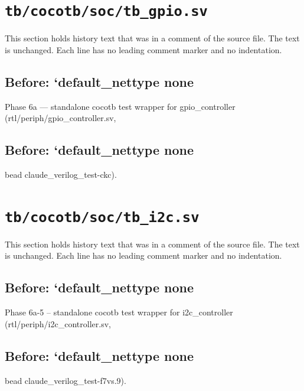 \section{\texttt{tb/cocotb/soc/tb\_gpio.sv}}\label{cr:suite:soc-tb-gpio-sv}

This section holds history text that was in a comment of the source file. The text is unchanged. Each line has no leading comment marker and no indentation.

\begin{record}

\subsection*{Before: `default\_nettype none}

\begin{textblock}
Phase 6a — standalone cocotb test wrapper for gpio_controller (rtl/periph/gpio_controller.sv,
\end{textblock}

\subsection*{Before: `default\_nettype none}

\begin{textblock}
bead claude_verilog_test-ckc).
\end{textblock}

\end{record}

\section{\texttt{tb/cocotb/soc/tb\_i2c.sv}}\label{cr:suite:soc-tb-i2c-sv}

This section holds history text that was in a comment of the source file. The text is unchanged. Each line has no leading comment marker and no indentation.

\begin{record}

\subsection*{Before: `default\_nettype none}

\begin{textblock}
Phase 6a-5 -- standalone cocotb test wrapper for i2c_controller (rtl/periph/i2c_controller.sv,
\end{textblock}

\subsection*{Before: `default\_nettype none}

\begin{textblock}
bead claude_verilog_test-f7vs.9).
\end{textblock}

\end{record}

